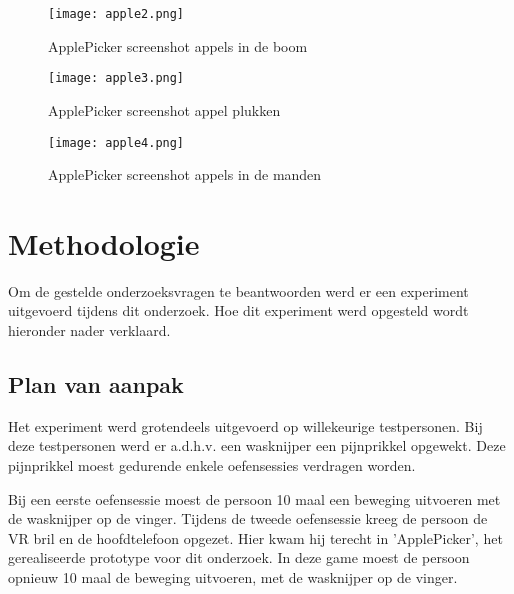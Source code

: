 \begin{figure}[h]
    \centering
    \texttt{[image: apple2.png]}
    \caption{ApplePicker screenshot appels in de boom}
\end{figure}

\begin{figure}[h]
    \centering
    \texttt{[image: apple3.png]}
    \caption{ApplePicker screenshot appel plukken}
\end{figure}

\begin{figure}[h]
    \centering
    \texttt{[image: apple4.png]}
    \caption{ApplePicker screenshot appels in de manden}
\end{figure}


\chapter{Methodologie}
\label{ch:methodologie}


Om de gestelde onderzoeksvragen te beantwoorden werd er een experiment uitgevoerd tijdens dit onderzoek.
Hoe dit experiment werd opgesteld wordt hieronder nader verklaard.

\section{Plan van aanpak}

Het experiment werd grotendeels uitgevoerd op willekeurige testpersonen. Bij deze testpersonen werd er a.d.h.v. een wasknijper een pijnprikkel opgewekt. Deze pijnprikkel moest gedurende enkele oefensessies verdragen worden.

Bij een eerste oefensessie moest de persoon 10 maal een beweging uitvoeren met de wasknijper op de vinger. 
Tijdens de tweede oefensessie kreeg de persoon de VR bril en de hoofdtelefoon opgezet. Hier kwam hij terecht in 'ApplePicker', het gerealiseerde prototype voor dit onderzoek. In deze game moest de persoon opnieuw 10 maal de beweging uitvoeren, met de wasknijper op de vinger.


